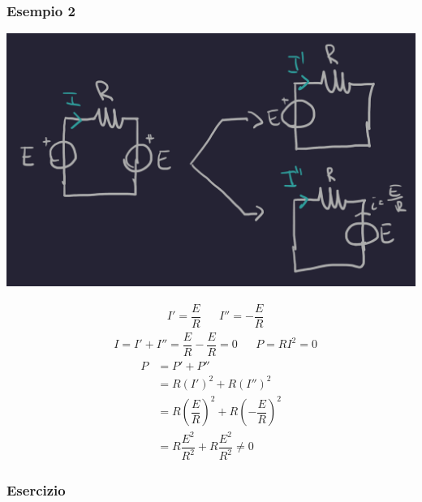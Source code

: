 \documentclass{article}
\begin{document}
\subsubsection{Esempio 2}
\begin{center}
    \includegraphics[scale=0.25]{Image/Esempio_MetAnalisi_4.png}
\end{center}
\begin{align*}
    &I'= \dfrac{E}{R} & &I'' = - \dfrac{E}{R}
\end{align*}
\begin{align*}
    &I = I' + I'' = \dfrac{E}{R} - \dfrac{E}{R} = 0 & &P=RI^2 = 0
\end{align*}
\begin{align*}
    P &= P' + P'' \\
    &= R (I')^2 + R(I'')^2 \\
    &= R \left( \dfrac{E}{R}\right)^2 + R \left(- \dfrac{E}{R}\right)^2\\
    &=R \dfrac{E^2}{R^2} + R \dfrac{E^2}{R^2} \neq 0
\end{align*}



\subsubsection{Esercizio}
\end{document}
